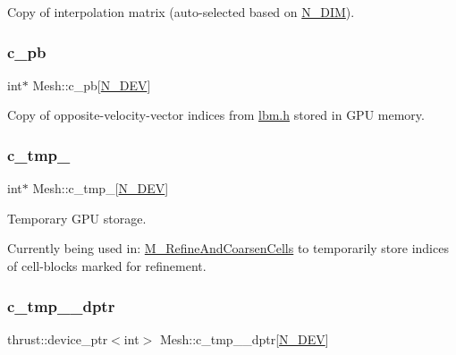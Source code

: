 Copy of interpolation matrix (auto-\/selected based on \hyperlink{cppspec_8h_a327d0faa306d7663502be8df312a815e}{N\+\_\+\+D\+IM}). 

\mbox{\label{classMesh_a81daee125bc85f7d5034930169683f2c}} 
\subsubsection{\texorpdfstring{c\+\_\+pb}{c\_pb}}
{\footnotesize\ttfamily int$\ast$ Mesh\+::c\+\_\+pb\mbox{[}\hyperlink{cppspec_8h_a2b674dab7a14f1bf32b48b7fda5022dc}{N\+\_\+\+D\+EV}\mbox{]}}



Copy of opposite-\/velocity-\/vector indices from \hyperlink{lbm_8h}{lbm.\+h} stored in G\+PU memory. 

\mbox{\label{classMesh_a2d6d66223791e211c83a72f9114f8845}} 
\subsubsection{\texorpdfstring{c\+\_\+tmp\+\_}{c\_tmp\_1}}
{\footnotesize\ttfamily int$\ast$ Mesh\+::c\+\_\+tmp\+\_\mbox{[}\hyperlink{cppspec_8h_a2b674dab7a14f1bf32b48b7fda5022dc}{N\+\_\+\+D\+EV}\mbox{]}\hspace{0.3cm}{\ttfamily [private]}}



Temporary G\+PU storage. 

Currently being used in\+: \hyperlink{classMesh_a7f1c861db5b8168cff9dabf728c0ce1a}{M\+\_\+\+Refine\+And\+Coarsen\+Cells} to temporarily store indices of cell-\/blocks marked for refinement. \mbox{\label{classMesh_a41b9976bd2ef8d8776c5f1e92c97cc89}} 
\subsubsection{\texorpdfstring{c\+\_\+tmp\+\_\+\_\+dptr}{c\_tmp\_1\_dptr}}
{\footnotesize\ttfamily thrust\+::device\+\_\+ptr$<$int$>$ Mesh\+::c\+\_\+tmp\+\_\+\_\+dptr\mbox{[}\hyperlink{cppspec_8h_a2b674dab7a14f1bf32b48b7fda5022dc}{N\+\_\+\+D\+EV}\mbox{]}\hspace{0.3cm}{\ttfamily [private]}}



